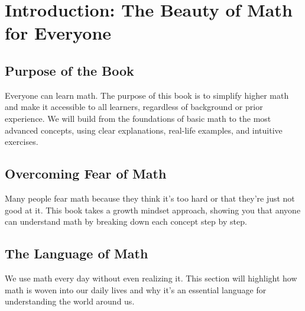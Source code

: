 \chapter{Introduction: The Beauty of Math for Everyone}
\section{Purpose of the Book}
Everyone can learn math. The purpose of this book is to simplify higher math and make it accessible to all learners, regardless of background or prior experience.
We will build from the foundations of basic math to the most advanced concepts, using clear explanations, real-life examples, and intuitive exercises.

\section{Overcoming Fear of Math}
Many people fear math because they think it's too hard or that they're just not good at it. This book takes a growth mindset approach, showing you that anyone can understand math by breaking down each concept step by step.

\section{The Language of Math}
We use math every day without even realizing it. This section will highlight how math is woven into our daily lives and why it's an essential language for understanding the world around us.